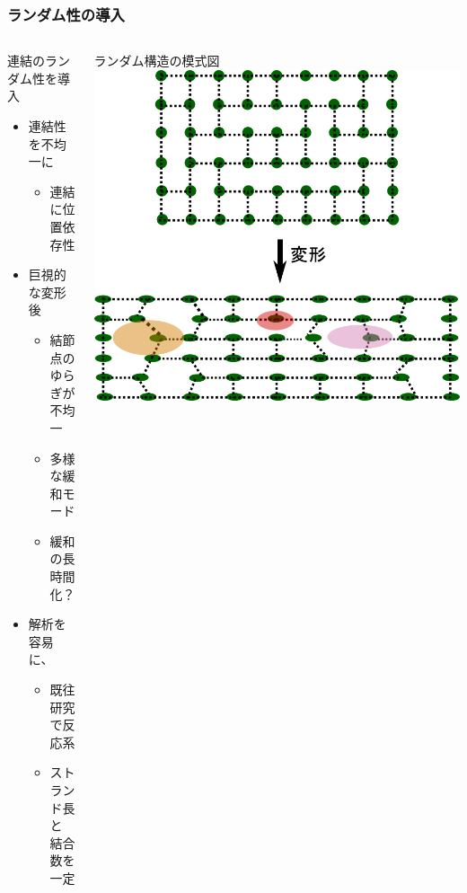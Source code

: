 \documentclass[12pt, dvipdfmx]{beamer}
\begin{document}
\begin{frame}
    \frametitle{ランダム性の導入}
    \vspace{-3mm}
		\begin{columns}[totalwidth=1\textwidth]
				\begin{block}{連結のランダム性を導入}
					\begin{itemize}
						\item 連結性を不均一に
							\begin{itemize}
								\item 連結に\alert{位置依存性}
							\end{itemize}
						\item 巨視的な変形後
							\begin{itemize}
								\item 結節点のゆらぎが\\不均一
								\item 多様な緩和モード
								\item \alert{緩和の長時間化？}
							\end{itemize}
						\item \alert{解析を容易}に、
                            \begin{itemize}
                                \item 既往研究で反応系
								\item ストランド長と\\結合数を一定
							\end{itemize}
					\end{itemize}
				\end{block}
				ランダム構造の模式図
				\vspace{5mm}
				\includegraphics[width=\textwidth]{random_NW.png}

\end{columns}
\end{frame}
\end{document}
